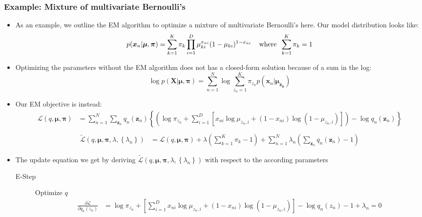 \subsubsection{Example: Mixture of multivariate Bernoulli's}
\begin{itemize}
	\item As an example, we outline the EM algorithm to optimize a mixture of multivariate Bernoulli's here. Our model distribution looks like:
	$$p(\bm{x}_n|\bm{\mu}, \bm{\pi}) = \sum_{k=1}^{K} \pi_k \prod_{i=1}^{D} \mu_{ki}^{x_{ni}} (1- \mu_{ki})^{1-x_{ni}} \hspace{4mm}\text{where}\hspace{2mm} \sum_{k=1}^{K}\pi_k = 1$$
	\item Optimizing the parameters without the EM algorithm does not has a closed-form solution because of a sum in the log:
	$$\log p(\bm{X}|\bm{\mu},\bm{\pi}) = \sum_{n=1}^{N} \log \sum_{z_n=1}^{K} \pi_{z_n} p(\bm{x}_n|\bm{\mu_{z_n}})$$
	\item Our EM objective is instead:
	\begin{equation*}
		\begin{split}
			\mathcal{L}(q,\bm{\mu}, \bm{\pi}) & = \sum_{n=1}^{N} \sum_{\bm{z}_n} q_n(\bm{z}_n) \left\{ \left(\log \pi_{z_n} + \sum_{i=1}^{D}\left[x_{ni}\log \mu_{z_n,i} + (1 - x_{ni})\log (1 - \mu_{z_n,i})\right]\right)- \log q_n(\bm{z}_n)\right\}\\
		\end{split}
	\end{equation*}
	\begin{equation*}
		\begin{split}
			\tilde{\mathcal{L}}(q,\bm{\mu}, \bm{\pi}, \lambda, \left\{\lambda_n\right\}) & = \mathcal{L}(q,\bm{\mu}, \bm{\pi}) + \lambda \left(\sum_{k=1}^{K} \pi_k - 1\right) + \sum_{n=1}^{N} \lambda_n \left(\sum_{\bm{z}_n} q_n(\bm{z}_n) - 1\right)
		\end{split}
	\end{equation*}
	\item The update equation we get by deriving $\tilde{\mathcal{L}}(q,\bm{\mu}, \bm{\pi}, \lambda, \left\{\lambda_n\right\})$ with respect to the according parameters
	\begin{description}
		\item[E-Step] Optimize $q$
		\begin{equation*}
			\begin{split}
				\frac{\partial \tilde{\mathcal{L}}}{\partial q_n(z_n)} & = \log \pi_{z_n} + \left[\sum_{i=1}^{D} x_{ni}\log \mu_{z_n,i}+(1-x_{ni})\log (1-\mu_{z_n,i})\right] - \log q_n(z_n) - 1 + \lambda_n = 0\\

\end{split}
\end{equation*}
\end{description}
\end{itemize}
